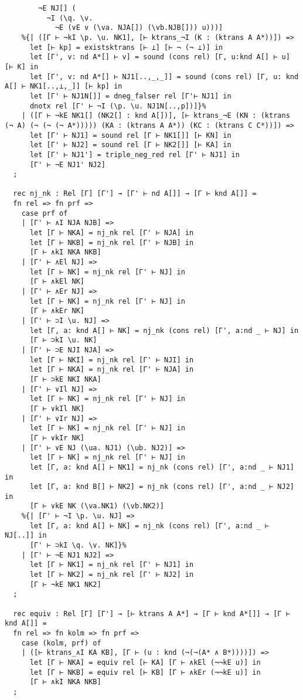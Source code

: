 \documentclass{article}
\begin{document}
\begin{lstlisting}
        ¬E NJ[] (
          ¬I (\q. \v.
            ¬E (∨E v (\va. NJA[]) (\vb.NJB[])) u)))]
    %{| ([Γ ⊢ ¬kI \p. \u. NK1], [⊢ ktrans_¬I (K : (ktrans A A*))]) =>
      let [⊢ kp] = existsktrans [⊢ ⊥] [⊢ ¬ (¬ ⊥)] in
      let [Γ', v: nd A*[] ⊢ v] = sound (cons rel) [Γ, u:knd A[] ⊢ u] [⊢ K] in
      let [Γ', v: nd A*[] ⊢ NJ1[..,_,_]] = sound (cons rel) [Γ, u: knd A[] ⊢ NK1[..,⊥,_]] [⊢ kp] in
      let [Γ' ⊢ NJ1N[]] = dneg_falser rel [Γ'⊢ NJ1] in
      dnotx rel [Γ' ⊢ ¬I (\p. \u. NJ1N[..,p])]}%
    | ([Γ ⊢ ¬kE NK1[] (NK2[] : knd A[])], [⊢ ktrans_¬E (KN : (ktrans (¬ A) (¬ (¬ (¬ A*))))) (KA : (ktrans A A*)) (KC : (ktrans C C*))]) =>
      let [Γ' ⊢ NJ1] = sound rel [Γ ⊢ NK1[]] [⊢ KN] in
      let [Γ' ⊢ NJ2] = sound rel [Γ ⊢ NK2[]] [⊢ KA] in
      let [Γ' ⊢ NJ1'] = triple_neg_red rel [Γ' ⊢ NJ1] in
      [Γ' ⊢ ¬E NJ1' NJ2]
  ;
  
  rec nj_nk : Rel [Γ] [Γ'] → [Γ' ⊢ nd A[]] → [Γ ⊢ knd A[]] = 
  fn rel => fn prf =>
    case prf of
    | [Γ' ⊢ ∧I NJA NJB] =>
      let [Γ ⊢ NKA] = nj_nk rel [Γ' ⊢ NJA] in
      let [Γ ⊢ NKB] = nj_nk rel [Γ' ⊢ NJB] in
      [Γ ⊢ ∧kI NKA NKB]
    | [Γ' ⊢ ∧El NJ] =>
      let [Γ ⊢ NK] = nj_nk rel [Γ' ⊢ NJ] in
      [Γ ⊢ ∧kEl NK]
    | [Γ' ⊢ ∧Er NJ] =>
      let [Γ ⊢ NK] = nj_nk rel [Γ' ⊢ NJ] in
      [Γ ⊢ ∧kEr NK]
    | [Γ' ⊢ ⊃I \u. NJ] =>
      let [Γ, a: knd A[] ⊢ NK] = nj_nk (cons rel) [Γ', a:nd _ ⊢ NJ] in
      [Γ ⊢ ⊃kI \u. NK]
    | [Γ' ⊢ ⊃E NJI NJA] =>
      let [Γ ⊢ NKI] = nj_nk rel [Γ' ⊢ NJI] in
      let [Γ ⊢ NKA] = nj_nk rel [Γ' ⊢ NJA] in
      [Γ ⊢ ⊃kE NKI NKA]
    | [Γ' ⊢ ∨Il NJ] =>
      let [Γ ⊢ NK] = nj_nk rel [Γ' ⊢ NJ] in
      [Γ ⊢ ∨kIl NK]
    | [Γ' ⊢ ∨Ir NJ] =>
      let [Γ ⊢ NK] = nj_nk rel [Γ' ⊢ NJ] in
      [Γ ⊢ ∨kIr NK]
    | [Γ' ⊢ ∨E NJ (\ua. NJ1) (\ub. NJ2)] =>
      let [Γ ⊢ NK] = nj_nk rel [Γ' ⊢ NJ] in
      let [Γ, a: knd A[] ⊢ NK1] = nj_nk (cons rel) [Γ', a:nd _ ⊢ NJ1] in
      let [Γ, a: knd B[] ⊢ NK2] = nj_nk (cons rel) [Γ', a:nd _ ⊢ NJ2] in
      [Γ ⊢ ∨kE NK (\va.NK1) (\vb.NK2)]
    %{| [Γ' ⊢ ¬I \p. \u. NJ] =>
      let [Γ, a: knd A[] ⊢ NK] = nj_nk (cons rel) [Γ', a:nd _ ⊢ NJ[..]] in
      [Γ' ⊢ ⊃kI \q. \v. NK]}%
    | [Γ' ⊢ ¬E NJ1 NJ2] =>
      let [Γ ⊢ NK1] = nj_nk rel [Γ' ⊢ NJ1] in
      let [Γ ⊢ NK2] = nj_nk rel [Γ' ⊢ NJ2] in
      [Γ ⊢ ¬kE NK1 NK2]
  ;
  
  rec equiv : Rel [Γ] [Γ'] → [⊢ ktrans A A*] → [Γ ⊢ knd A*[]] → [Γ ⊢ knd A[]] =
  fn rel => fn kolm => fn prf =>
    case (kolm, prf) of
    | ([⊢ ktrans_∧I KA KB], [Γ ⊢ (u : knd (¬(¬(A* ∧ B*))))]) =>
      let [Γ ⊢ NKA] = equiv rel [⊢ KA] [Γ ⊢ ∧kEl (¬¬kE u)] in 
      let [Γ ⊢ NKB] = equiv rel [⊢ KB] [Γ ⊢ ∧kEr (¬¬kE u)] in
      [Γ ⊢ ∧kI NKA NKB]
  ;
\end{lstlisting}
\end{document}
